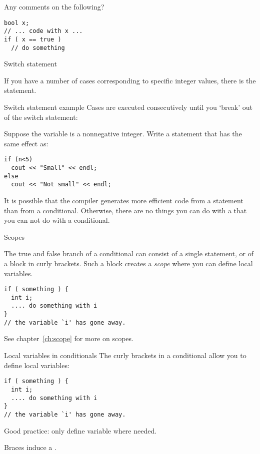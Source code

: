 \begin{review}
  \label{q:true}
  Any comments on the following?
\begin{lstlisting}
bool x;
// ... code with x ...
if ( x == true )
  // do something
\end{lstlisting}
  
\end{review}

 {Switch statement}

If you have a number of cases corresponding to specific integer
values, there is the  statement.

\begin{block}{Switch statement example}
  \label{sl:switch}
  Cases are executed consecutively until you `break' out of the switch
  statement:
  \renewcommand\snippetcodefraction{.5}
  \renewcommand\snippetanswfraction{.48}
\end{block}

\begin{exercise}
  \label{ex:switch-range}
  Suppose the variable  is a nonnegative integer. Write a
   statement that has the same effect as:
\begin{lstlisting}
if (n<5)
  cout << "Small" << endl;
else
  cout << "Not small" << endl;
\end{lstlisting}
\end{exercise}

It is possible that the compiler generates more efficient code
from a  statement than from a conditional.
Otherwise, there are no things you can do with a 
that you can not do with a conditional.

 {Scopes}

The true and false branch of a conditional can consist of a single
statement, or of a block in curly brackets. Such a block creates a
%
\emph{scope}
%
where you can define local variables.

\begin{lstlisting}
if ( something ) {
  int i; 
  .... do something with i
}
// the variable `i' has gone away.
\end{lstlisting}

See chapter~\ref{ch:scope} for more on scopes.

\begin{slide}{Local variables in conditionals}
  \label{sl:if-scope}
  The curly brackets in a conditional allow you to define local variables:
\begin{lstlisting}
if ( something ) {
  int i; 
  .... do something with i
}
// the variable `i' has gone away.
\end{lstlisting}
Good practice: only define variable where needed.

Braces induce a .
\end{slide}

